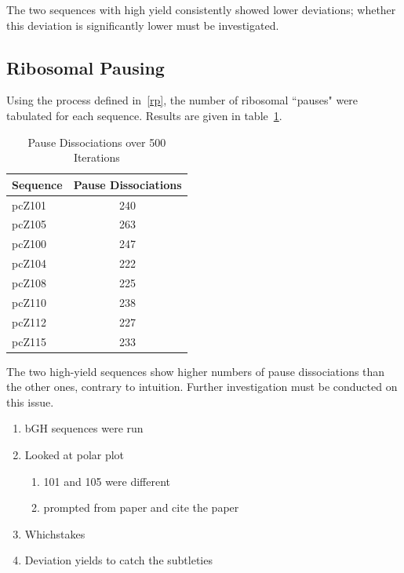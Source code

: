\documentclass[10pt,twocolumn,draft]{article}
\begin{document}
The two sequences with high yield consistently showed lower deviations; whether this deviation is significantly lower must be investigated.

\subsection{Ribosomal Pausing}

Using the process defined in~\ref{rp}, the number of ribosomal ``pauses" were tabulated for each sequence.
Results are given in table~\ref{wichita}.

\begin{table}[htbp]
\begin{center}
\begin{tabular}{|lc|}\hline
\textbf{Sequence} & Pause Dissociations\\\hline
pcZ101 & 240\\
pcZ105 & 263\\\hline
pcZ100 & 247\\
pcZ104 & 222\\
pcZ108 & 225\\
pcZ110 & 238\\
pcZ112 & 227\\
pcZ115 & 233\\\hline
\end{tabular}
\caption{Pause Dissociations over 500 Iterations}
\label{wichita}
\end{center}
\end{table}

The two high-yield sequences show higher numbers of pause dissociations than the other ones, contrary to intuition.
Further investigation must be conducted on this issue.

\begin{enumerate}


\item bGH sequences were run

\item Looked at polar plot
    
    \begin{enumerate}
    
    \item 101 and 105 were different
    
    \item prompted from paper and cite the paper
    
    \end{enumerate}

\item Whichstakes

\item Deviation yields to catch the subtleties 

\end{enumerate}

\end{document}
